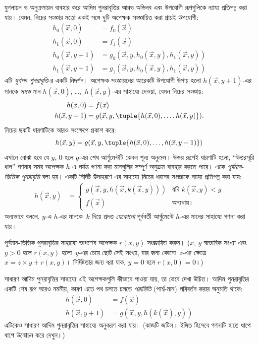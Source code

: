 \documentclass[../../../include/open-logic-section]{subfiles}
\begin{document}

যুগলায়ন ও অনুক্রমায়ন ব্যবহার করে আদিম পুনরাবৃত্তির আরও অভিনব এবং
উপযোগী রূপগুলিকে ন্যায্য প্রতিপন্ন করা যায়। যেমন, নিচের সংজ্ঞার মতো
একই সঙ্গে দুটি অপেক্ষক সংজ্ঞায়িত করা প্রায়ই উপযোগী:
\begin{align*}
h_0(\vec x, 0) & = f_0(\vec x) \\
h_1(\vec x, 0) & = f_1(\vec x) \\
h_0(\vec x, y+1) & = g_0(\vec x, y, h_0(\vec x, y), h_1(\vec x, y)) \\
h_1(\vec x, y+1) & = g_1(\vec x, y, h_0(\vec x, y), h_1(\vec x, y))
\end{align*}
এটি \emph{যুগপৎ পুনরাবৃত্তি}-র একটি নিদর্শন। অপেক্ষক সংজ্ঞায়নের আরেকটি
উপযোগী উপায় হলো $h(\vec x, y+1)$-এর মানকে
\emph{সমস্ত} মান $h(\vec x, 0)$, \dots,~$h(\vec x, y)$-এর সাহায্যে
দেওয়া, যেমন নিচের সংজ্ঞায়:
\begin{align*}
h(\vec x, 0) & = f(\vec x) \\
h(\vec x, y+1) & = g(\vec x, y, \tuple{h(\vec x, 0), \dots, h(\vec x, y)}).
\end{align*}
নিচের ছকটি ধারণাটিকে আরও সংক্ষেপে প্রকাশ করে:
\[
h(\vec x, y) = g(\vec x, y, \tuple{h(\vec x, 0), \dots, h(\vec x, y-1)})
\]
এখানে বোঝা হবে যে $y$, $0$ হলে $g$-এর শেষ আর্গুমেন্টটি কেবল শূন্য
অনুক্রম। উভয় রূপেই ধারণাটি হলো, “উত্তরসূরি ধাপ” গণনার সময় অপেক্ষক $h$
এ পর্যন্ত গণনা করা মানগুলির সম্পূর্ণ অনুক্রম ব্যবহার করতে পারে। একে
\emph{পূর্বমান-ভিত্তিক পুনরাবৃত্তি} বলা হয়। একটি নির্দিষ্ট উদাহরণে এর
সাহায্যে নিচের ধরনের সংজ্ঞাকে ন্যায্য প্রতিপন্ন করা যায়:
\begin{align*}
h(\vec x, y) & = \begin{cases}
  g(\vec x, y, h(\vec x, k(\vec x, y))) & \text{যদি $k(\vec x, y) < y$} \\
  f(\vec x) & \text{অন্যথায়।}
\end{cases}
\end{align*}
অন্যভাবে বললে, $y$-এ $h$-এর মানকে~$k$ দিয়ে প্রদত্ত
\emph{যেকোনো} পূর্ববর্তী আর্গুমেন্টে $h$-এর মানের সাহায্যে গণনা করা যায়।


\begin{prob}
  পূর্বমান-ভিত্তিক পুনরাবৃত্তির সাহায্যে ভাগশেষ অপেক্ষক $r(x,y)$
  সংজ্ঞায়িত করুন। ($x$, $y$ স্বাভাবিক সংখ্যা এবং $y > 0$ হলে $r(x,y)$
  হলো~$y$-এর চেয়ে ছোট সেই সংখ্যা, যার জন্য কোনো~$z$-এর ক্ষেত্রে
  $x = z\times y + r(x,y)$। নির্দিষ্টতার জন্য ধরা যাক, $y=0$ হলে
  $r(x,0) = 0$।)
\end{prob}

সাধারণ আদিম পুনরাবৃত্তির সাহায্যে এই অপেক্ষকগুলি কীভাবে পাওয়া যায়, তা
ভেবে দেখা উচিত। আদিম পুনরাবৃত্তির একটি শেষ রূপ আরও নমনীয়, কারণ এতে
পথ চলতে চলতে \emph{পরামিতি} (পার্শ্ব-মান) পরিবর্তন করার অনুমতি থাকে:
\begin{align*}
h(\vec x, 0) & = f(\vec x) \\
h(\vec x, y+1) & = g(\vec x, y, h(k(\vec x), y))
\end{align*}
এটিকেও সাধারণ আদিম পুনরাবৃত্তির সাহায্যে অনুকরণ করা যায়। (কাজটি
জটিল। ইঙ্গিত হিসেবে গণনাটি হাতে ধাপে ধাপে উন্মোচন করে দেখুন।)
\end{document}
